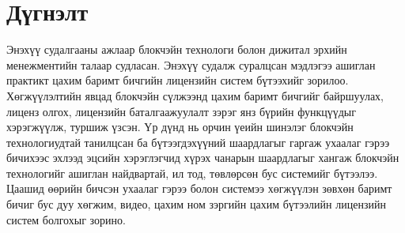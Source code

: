 \chapter{Дүгнэлт}
Энэхүү судалгааны ажлаар блокчэйн технологи болон дижитал эрхийн менежментийн талаар судласан. Энэхүү судалж суралцсан мэдлэгээ ашиглан практикт цахим баримт бичгийн лицензийн систем бүтээхийг зорилоо. Хөгжүүлэлтийн явцад блокчэйн сүлжээнд цахим баримт бичгийг байршуулах, лиценз олгох, лицензийн баталгаажуулалт зэрэг янз бүрийн функцүүдыг хэрэгжүүлж, туршиж үзсэн.
Үр дүнд нь орчин үеийн шинэлэг блокчэйн технологиудтай танилцсан ба бүтээгдэхүүний шаардлагыг гаргаж ухаалаг гэрээ бичихээс эхлээд эцсийн хэрэглэгчид хүрэх чанарын шаардлагыг хангаж блокчэйн технологийг ашиглан найдвартай, ил тод, төвлөрсөн бус системийг бүтээлээ. Цаашид өөрийн бичсэн ухаалаг гэрээ болон системээ хөгжүүлэн зөвхөн баримт бичиг бус дуу хөгжим, видео, цахим ном зэргийн цахим бүтээлийн лицензийн систем болгохыг зорино.